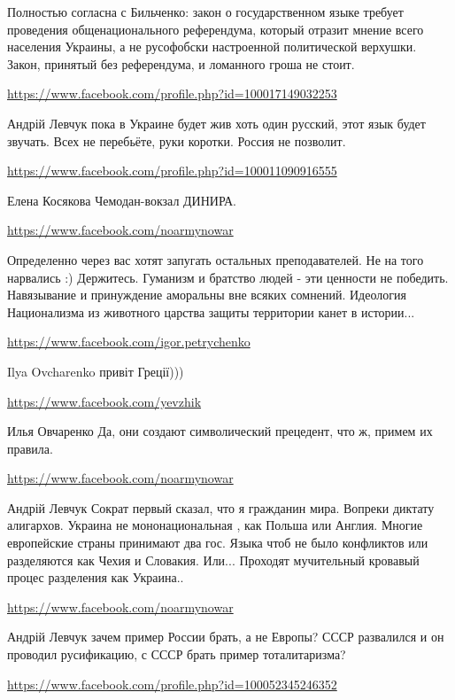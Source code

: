 \documentclass[a4paper,11pt]{extreport}
\begin{document}
\begin{itemize}
Полностью согласна с Бильченко: закон о государственном языке требует проведения общенационального референдума, который отразит мнение всего населения Украины, а не русофобски настроенной политической верхушки. Закон, принятый без референдума, и ломанного гроша не стоит.

\begin{itemize}
\url{https://www.facebook.com/profile.php?id=100017149032253}

Андрій Левчук пока в Украине будет жив хоть один русский, этот язык будет звучать. Всех не перебьёте, руки коротки. Россия не позволит.

\url{https://www.facebook.com/profile.php?id=100011090916555}

Елена Косякова Чемодан-вокзал ДИНИРА.

\end{itemize}
\url{https://www.facebook.com/noarmynowar}

Определенно через вас хотят запугать остальных преподавателей. Не на того нарвались :) Держитесь. Гуманизм и братство людей - эти ценности не победить. Навязывание и принуждение аморальны вне всяких сомнений. Идеология Национализма из животного царства защиты территории канет в истории...

\begin{itemize}
\url{https://www.facebook.com/igor.petrychenko}

Ilya Ovcharenko привіт Греції)))

\url{https://www.facebook.com/yevzhik}

Илья Овчаренко Да, они создают символический прецедент, что ж, примем их правила.

\url{https://www.facebook.com/noarmynowar}

Андрій Левчук Сократ первый сказал, что я гражданин мира. Вопреки диктату алигархов. Украина не мононациональная , как Польша или Англия. Многие европейские страны принимают два гос. Языка чтоб не было конфликтов или разделяются как Чехия и Словакия. Или... Проходят мучительный кровавый процес разделения как Украина..

\url{https://www.facebook.com/noarmynowar}

Андрій Левчук зачем пример России брать, а не Европы? СССР развалился и он проводил русификацию, с СССР брать пример тоталитаризма?

\url{https://www.facebook.com/profile.php?id=100052345246352}


\end{itemize}
\end{itemize}
\end{document}
